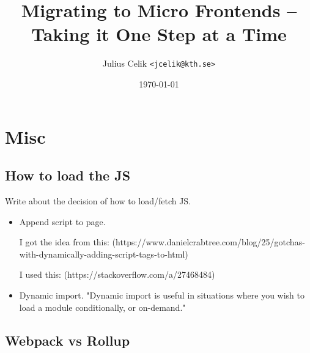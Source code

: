 \documentclass{report}
\title{Migrating to Micro Frontends -- Taking it One Step at a Time}
\author{Julius Celik \texttt{<jcelik@kth.se>}}
\date{\today}
\begin{document}
\maketitle


% 


% 


\chapter{Misc}

\section{How to load the JS}
Write about the decision of how to load/fetch JS.

\begin{itemize}
    \item Append script to page. 
    
    I got the idea from this: (https://www.danielcrabtree.com/blog/25/gotchas-with-dynamically-adding-script-tags-to-html)
    
    I used this: (https://stackoverflow.com/a/27468484)
    \item Dynamic import. "Dynamic import is useful in situations where you wish to load a module conditionally, or on-demand." \cite{MDNWebDocs2020}
\end{itemize}

\section{Webpack vs Rollup}

\printbibliography
\end{document}
